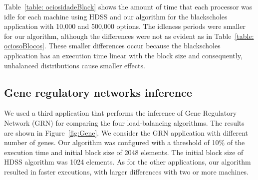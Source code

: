 \documentclass[journal]{IEEEtran}
\begin{document}
Table~\ref{table: ociosidadeBlack} shows the amount of time that each processor
was idle for each machine using HDSS and our algorithm for the blackscholes
application with 10,000 and 500,000 options. The idleness periods were smaller
for our algorithm, although the differences were not as evident as in
Table~\ref{table: ociosoBlocos}. These smaller differences occur because the
blackscholes application has an execution time linear with the block size and
consequently, unbalanced distributions cause smaller effects.




\subsection{Gene regulatory networks inference}

We used a third application that performs the inference of Gene Regulatory
Network (GRN) for comparing the four load-balancing algorithms. The results are
shown in Figure~\ref{fig:Gene}. We consider the GRN application with different
number of genes. Our algorithm was configured with a threshold of 10\% of the
execution time and initial block size of 2048 elements. The initial block size
of HDSS algorithm was 1024 elements. As for the other applications, our
algorithm resulted in faster executions, with larger differences with two or
more machines.
\end{document}
